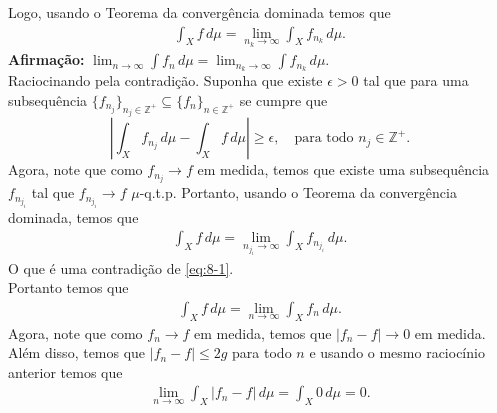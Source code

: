 \begin{homeworkProblem}[8]
\begin{solution}
\begin{enumerate}[a)]
        Logo, usando o Teorema da convergência dominada temos que
        \begin{align*}
          \int_{X}f\,d\mu =\lim_{n_k \to \infty}\int_{X}f_{n_k}\,d\mu. 
        \end{align*}
        \textbf{Afirmação:} $\lim_{n \to \infty}\int f_n\,d\mu=\lim_{n_k \to \infty}\int f_{n_k}\,d\mu$.\\
        Raciocinando pela contradição. Suponha que existe $\epsilon>0$ tal que para uma subsequência $\{f_{n_j}\}_{n_j\in\mathbb{Z}^{+}}\subseteq \{f_{n}\}_{n\in\mathbb{Z}^{+}}$ se cumpre que
        \begin{equation}\label{eq:8-1}
          \left| \int_{X}f_{n_j}\,d\mu - \int_{X}f\,d\mu \right|\geq \epsilon,\quad\text{para todo }n_j\in\mathbb{Z}^{+}.
        \end{equation}
        Agora, note que como $f_{n_j}\to f$ em medida, temos que existe uma subsequência $f_{n_{j_i}}$ tal que $f_{n_{j_i}}\to f$ $\mu$-q.t.p. Portanto, usando o Teorema da convergência dominada, temos que
        \begin{align*}
          \int_{X}f\,d\mu=\lim_{n_{j_i} \to \infty}\int_{X}f_{n_{j_i}}\,d\mu.
        \end{align*}
        O que é uma contradição de \eqref{eq:8-1}.\\
        Portanto temos que
        \begin{align*}
          \int_{X}f\,d\mu=\lim_{n \to \infty}\int_{X}f_{n}\,d\mu.
        \end{align*}
        Agora, note que como $f_n\to f$ em medida, temos que $|f_n-f|\to 0$ em medida. Além disso, temos que $|f_n-f|\leq 2g$ para todo $n$ e usando o mesmo raciocínio anterior temos que
        \begin{align*}
          \lim_{n \to \infty}\int_{X}|f_n-f|\,d\mu=\int_{X}0\,d\mu=0.
        \end{align*}
  \end{enumerate} 
  \end{solution}
\end{homeworkProblem}
